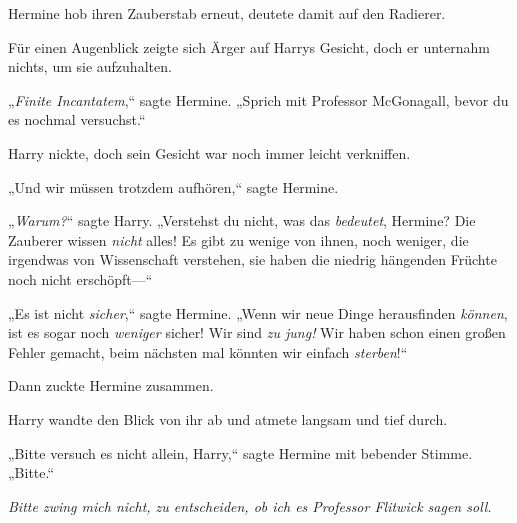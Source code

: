 Hermine hob ihren Zauberstab erneut, deutete damit auf den Radierer.

Für einen Augenblick zeigte sich Ärger auf Harrys Gesicht, doch er unternahm nichts, um sie aufzuhalten.

„\emph{Finite Incantatem},“ sagte Hermine. „Sprich mit Professor McGonagall, bevor du es nochmal versuchst.“

Harry nickte, doch sein Gesicht war noch immer leicht verkniffen.

„Und wir müssen trotzdem aufhören,“ sagte Hermine.

„\emph{Warum?}“ sagte Harry. „Verstehst du nicht, was das \emph{bedeutet}, Hermine? Die Zauberer wissen \emph{nicht} alles! Es gibt zu wenige von ihnen, noch weniger, die irgendwas von Wissenschaft verstehen, sie haben die niedrig hängenden Früchte noch nicht erschöpft—“

„Es ist nicht \emph{sicher},“ sagte Hermine. „Wenn wir neue Dinge herausfinden \emph{können}, ist es sogar noch \emph{weniger} sicher! Wir sind \emph{zu jung!} Wir haben schon einen großen Fehler gemacht, beim nächsten mal könnten wir einfach \emph{sterben}!“

Dann zuckte Hermine zusammen.

Harry wandte den Blick von ihr ab und atmete langsam und tief durch.

„Bitte versuch es nicht allein, Harry,“ sagte Hermine mit bebender Stimme. „Bitte.“

\emph{Bitte zwing mich nicht, zu entscheiden, ob ich es Professor Flitwick sagen soll.}

